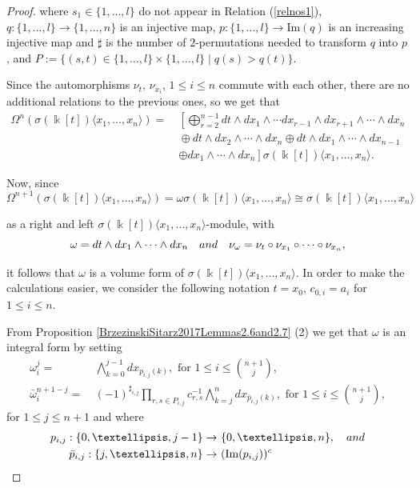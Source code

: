 \documentclass{amsart}
\theoremstyle{definition}
\theoremstyle{remark}
\numberwithin{equation}{section}
\begin{document}
\begin{proof}
where $s_1 \in \{1,\ldots,l\}$ do not appear in Relation {\rm (}\ref{relnos1}{\rm )}, $q:\{1,\ldots,l\}\rightarrow \{1,\ldots,n\}$ is an injective map, $p:\{1,\ldots,l\}\rightarrow \text{Im}(q)$ is an increasing injective map and $\sharp$ is the number of $2$-permutations needed to transform $q$ into $p$, and $P := \{(s, t) \in \{1, \ldots, l\} \times \{1, \ldots, l\} \mid q(s) >  q(t)\}$.

Since the automorphisms $\nu_{t}$, $\nu_{x_i}$, $1\leq i \leq n$ commute with each other, there are no additional relations to the previous ones, so we get that
\begin{align*}
\Omega^{n} (\sigma(\Bbbk[t])\langle x_1,\ldots, x_n\rangle) = &\ \left[\bigoplus_{r=2}^{n-1}dt\wedge dx_1\wedge \cdots dx_{r-1}\wedge dx_{r+1} \wedge \cdots \wedge dx_{n} \right. \\
&\ \oplus dt\wedge dx_2\wedge \cdots \wedge dx_{n} \oplus dt\wedge dx_1\wedge \cdots \wedge dx_{n-1}\\
&\ \left. \oplus dx_1\wedge \cdots \wedge dx_{n}\right]\sigma(\Bbbk[t])\langle x_1,\ldots, x_n\rangle.
\end{align*}

Now, since
\[
\Omega^{n+1} (\sigma(\Bbbk[t])\langle x_1,\ldots, x_n\rangle) = \omega\sigma(\Bbbk[t])\langle x_1,\ldots, x_n\rangle\cong \sigma(\Bbbk[t])\langle x_1,\ldots, x_n\rangle
\]

as a right and left $\sigma(\Bbbk[t])\langle x_1,\ldots, x_n\rangle$-module, with 
\[
\omega=dt\wedge dx_1 \wedge \cdots \wedge dx_n \quad {\rm and} \quad \nu_{\omega}=\nu_t\circ\nu_{x_1}\circ\cdots\circ\nu_{x_n},
\]

it follows that $\omega$ is a volume form of $\sigma(\Bbbk[t])\langle x_1,\ldots, x_n\rangle$. In order to make the calculations easier, we consider the following notation $t=x_0$, $c_{0,i}=a_i$ for $1\leq i \leq n$.

From Proposition \ref{BrzezinskiSitarz2017Lemmas2.6and2.7} (2) we get that $\omega$ is an integral form by setting
\begin{align*}
    \omega_i^j = &\ \bigwedge_{k=0}^{j-1}dx_{p_{i,j}(k)}, \text{ for } 1\leq i \leq \binom{n+1}{j}, \\
    \bar{\omega}_i^{n+1-j} = &\ (-1)^{\sharp_{i,j}}\prod_{r,s\in P_{i,j}}c_{r,s}^{-1}\bigwedge_{k=j}^{n}dx_{\bar{p}_{i,j}(k)}, \text{ for } 1\leq i \leq \binom{n+1}{j},
\end{align*}
for $1\leq j \leq n+1$ and where 
\begin{align*}
    p_{i,j}:\{0,\ldots,j-1\}\rightarrow &\ \{0,\ldots,n\}, \quad {\rm and} \\
\bar{p}_{i,j}:\{j,\ldots,n\}\rightarrow &\ (\text{Im}(p_{i,j}))^c
\end{align*}


\end{proof}
\end{document}
